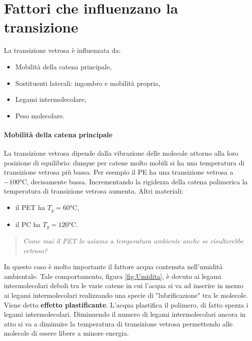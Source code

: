 \section{Fattori che influenzano la transizione}
La transizione vetrosa è influenzata da:
\begin{itemize}
\item Mobilità della catena principale,
\item Sostituenti laterali: ingombro e mobilità propria,
\item Legami intermolecolare,
\item Peso molecolare.
\end{itemize}

\paragraph{Mobilità della catena principale}
La transizione vetrosa dipende dalla vibrazione delle molecole attorno alla loro posizione di equilibrio: dunque per catene molto mobili si ha una temperatura di transizione vetrosa più bassa.
Per esempio il \ac{PE} ha una transizione vetrosa a $-100\unit{\celsius}$, decisamente bassa.   
Incrementando la rigidezza della catena polimerica la temperatura di transizione vetrosa aumenta.
Altri materiali:
\begin{itemize}
\item il \ac{PET} ha $T_g = 60\unit{\celsius}$,
\item il \ac{PC} ha $T_g = 120\unit{\celsius}$.
\end{itemize}

\begin{quote}
\emph{Come mai il \ac{PET} lo usiamo a temperatura ambiente anche se risulterebbe vetroso?}
\end{quote}
In questo caso è molto importante il fattore acqua contenuta nell'umidità ambientale.
Tale comportamento, figura \ref{fig:Umidita}, è dovuto ai legami intermolecolari deboli tra le varie catene in cui l'acqua si va ad inserire in mezzo ai legami intermolecolari realizzando una specie di "lubrificazione" tra le molecole. Viene detto \textbf{effetto plastificante}. L'acqua plastifica il polimero, di fatto spezza i legami intermolecolari.
Diminuendo il numero di legami intermolecolari ancora in atto si va a diminuire la temperatura di transizione vetrosa permettendo alle molecole di essere libere a minore energia. 

